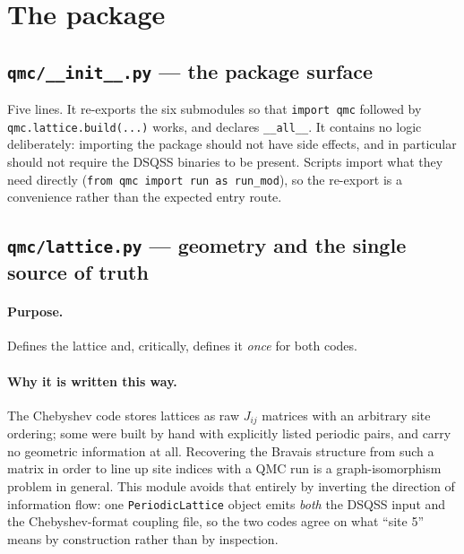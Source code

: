 \documentclass[11pt,a4paper]{article}
\newcommand{\code}[1]{\texttt{#1}}
\newcommand{\file}[1]{\texttt{\textbf{#1}}}
\begin{document}
\section{The package}

\subsection{\file{qmc/\_\_init\_\_.py} --- the package surface}

Five lines. It re-exports the six submodules so that \code{import qmc} followed
by \code{qmc.lattice.build(...)} works, and declares \code{\_\_all\_\_}. It
contains no logic deliberately: importing the package should not have side
effects, and in particular should not require the DSQSS binaries to be present.
Scripts import what they need directly
(\code{from qmc import run as run\_mod}), so the re-export is a convenience
rather than the expected entry route.

\subsection{\file{qmc/lattice.py} --- geometry and the single source of truth}

\paragraph{Purpose.} Defines the lattice and, critically, defines it \emph{once}
for both codes.

\paragraph{Why it is written this way.} The Chebyshev code stores lattices as
raw $J_{ij}$ matrices with an arbitrary site ordering; some were built by hand
with explicitly listed periodic pairs, and carry no geometric information at
all. Recovering the Bravais structure from such a matrix in order to line up
site indices with a QMC run is a graph-isomorphism problem in general. This
module avoids that entirely by inverting the direction of information flow: one
\code{PeriodicLattice} object emits \emph{both} the DSQSS input and the
Chebyshev-format coupling file, so the two codes agree on what ``site 5'' means
by construction rather than by inspection.
\end{document}
